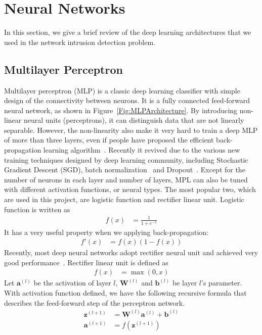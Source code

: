\section{Neural Networks}
In this section, we give a brief review of the deep learning architectures that we used
in the network intrusion detection problem.

\subsection{Multilayer Perceptron}
Multilayer perceptron (MLP) is a classic deep learning classifier with simple
design of the connectivity between neurons.
It is a fully connected feed-forward neural network, as shown in Figure~\ref{Fig:MLPArchitecture}.
By introducing non-linear neural units (perceptrons), it can distinguish data that are
not linearly separable.
However, the non-linearity also make it very hard to train a deep MLP of more than three layers,
even if people have proposed the efficient back-propagation learning algorithm~\cite{Backpropagation}.
Recently it revived due to the various new training techniques designed by deep learning community,
including Stochastic Gradient Descent (SGD),
batch normalization~\cite{BatchNorm} and Dropout~\cite{Dropout}.
Except for the number of neurons in each layer and number of layers,
MPL can also be tuned with different activation functions, or neural types.
The most popular two, which are used in this project, are logistic function
and rectifier linear unit.
Logistic function is written as
\begin{align}
    f(x) &= \frac{1}{1 + e^{-x}}
\end{align}
It has a very useful property when we applying back-propagation:
\begin{align}
    f'(x) &= f(x) (1-f(x))
\end{align}
Recently, most deep neural networks adopt rectifier neural unit and
achieved very good performance~\cite{DeepLearning}.
Rectifier linear unit is defined as
\begin{align}
    f(x) &= \max(0, x)
\end{align}
Let $\mathbf{a}^{(l)}$ be the activation of layer $l$,
$\mathbf{W}^{(l)}$ and $\mathbf{b}^{(l)}$ be layer $l$'s parameter.
With activation function defined, we have the following recursive formula that describes
the feed-forward step of the perceptron network.
\begin{align}
    \mathbf{z}^{(l+1)} &= \mathbf{W}^{(l)} \mathbf{a}^{(l)} + \mathbf{b}^{(l)} \label{Equ:MLPFeedForward1}\\
    \mathbf{a}^{(l+1)} &= f(\mathbf{z}^{(l+1)})
    \label{Equ:MLPFeedForward2}
\end{align}

